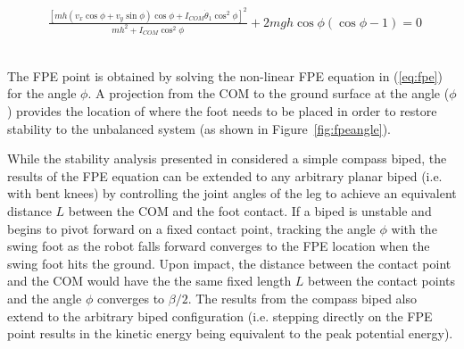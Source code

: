 \begin{figure}[!t]
	\begin{equation} \label{eq:fpe}
	\begin{aligned}
		\frac{{{{\left[ {mh({v_x}\cos \phi  + {v_y}\sin \phi )\cos \phi  + {I_{COM}}{{\dot \theta }_1}{{\cos }^2}\phi } \right]}^2}}}{{m{h^2} + {I_{COM}}{{\cos }^2}\phi }} + 2mgh\cos \phi (\cos \phi  - 1) = 0
	\end{aligned}
	\end{equation}
	\\
	\hrulefill
\end{figure}

The FPE point is obtained by solving the non-linear FPE equation in (\ref{eq:fpe}) for the angle $\phi$. A projection from the COM to the ground surface at the angle ($\phi$) provides the location of where the foot needs to be placed in order to restore stability to the unbalanced system (as shown in Figure~\ref{fig:fpeangle}).

While the stability analysis presented in \cite{Wight:2008ii} considered a simple compass biped, the results of the FPE equation can be extended to any arbitrary planar biped (i.e. with bent knees) by controlling the joint angles of the leg to achieve an equivalent distance $L$ between the COM and the foot contact. If a biped is unstable and begins to pivot forward on a fixed contact point, tracking the angle $\phi$ with the swing foot as the robot falls forward converges to the FPE location when the swing foot hits the ground. Upon impact, the distance between the contact point and the COM would have the the same fixed length $L$ between the contact points and the angle $\phi$ converges to $\beta/2$. The results from the compass biped also extend to the arbitrary biped configuration (i.e. stepping directly on the FPE point results in the kinetic energy being equivalent to the peak potential energy).

